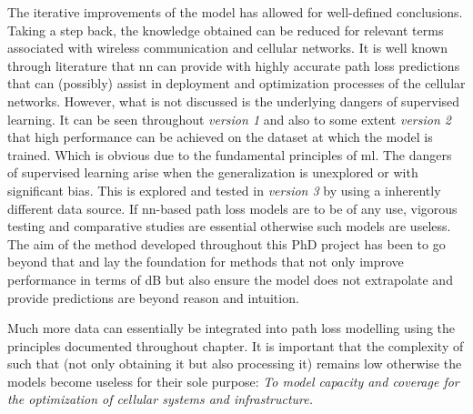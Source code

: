 The iterative improvements of the model has allowed for well-defined conclusions. Taking a step back, the knowledge obtained can be reduced for relevant terms associated with wireless communication and cellular networks. It is well known through literature that \gls{nn} can provide with highly accurate path loss predictions that can (possibly) assist in deployment and optimization processes of the cellular networks. However, what is not discussed is the underlying dangers of supervised learning. It can be seen throughout \emph{version 1} and also to some extent \emph{version 2} that high performance can be achieved on the dataset at which the model is trained. Which is obvious due to the fundamental principles of \gls{ml}. The dangers of supervised learning arise when the generalization is unexplored or with significant bias. This is explored and tested in \emph{version 3} by using a inherently different data source. If \gls{nn}-based path loss models are to be of any use, vigorous testing and comparative studies are essential otherwise such models are useless. The aim of the method developed throughout this PhD project has been to go beyond that and lay the foundation for methods that not only improve performance in terms of dB but also ensure the model does not extrapolate and provide predictions are beyond reason and intuition. 

Much more data can essentially be integrated into path loss modelling using the principles documented throughout chapter. It is important that the complexity of such that (not only obtaining it but also processing it) remains low otherwise the models become useless for their sole purpose: \emph{To model capacity and coverage for the optimization of cellular systems and infrastructure.}